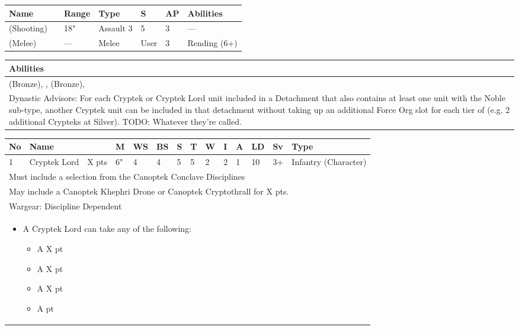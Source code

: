 \noindent
\begin{tabular}{||m{110pt} m{30pt} m{31pt} m{55pt} m{12pt} m{12pt} m{210pt}||}
	\hline
	Name & & Range & Type & S & AP & Abilities \\
	\hline
	\quickref{Staff of Light} (Shooting) & & 18" & Assault 3 & 5 & 3 & — \\
	\quickref{Staff of Light} (Melee) & & — & Melee & User & 3 & Rending (6+) \\
	\hline
\end{tabular}

\noindent
\begin{tabular}{||m{532pt}||}
	\hline
	Abilities \\
	\hline
	\quickref{Awakening Protocols}(Bronze), \quickref{Living Metal}, \quickref{Nodal Command} (Bronze), \quickref{Reanimation Protocols} \\
	Dynastic Advisors: For each Cryptek or Cryptek Lord unit included in a Detachment that also contains at least one unit with the Noble sub-type, another Cryptek unit can be included in that detachment without taking up an additional Force Org slot for each tier of \quickref{Command Protocols} (e.g. 2 additional Crypteks at Silver). TODO: Whatever they're called. \\
	\hline
\end{tabular}



\newpage
{}

\noindent
\begin{tabular}{||m{10pt} m{95pt} m{30pt} m{11pt} m{11pt} m{11pt} m{11pt} m{11pt} m{11pt} m{11pt} m{11pt} m{11pt} m{11pt} m{125pt}||}
	\hline
	No & Name & & M & WS & BS & S & T & W & I & A & LD & Sv & Type \\
	\hline
	1 & Cryptek Lord & X pts & 6" & 4 & 4 & 5 & 5 & 2 & 2 & 1 & 10 & 3+ & Infantry (Character)\\
	\hline
	\hline
	\multicolumn{14}{||Z{532 pt}||}{Must include a selection from the Canoptek Conclave Disciplines}\\
	\multicolumn{14}{||Z{532 pt}||}{May include a Canoptek Khephri Drone or Canoptek Cryptothrall for X pts.}\\	
	\hline
	\hline
	\multicolumn{14}{||Z{532 pt}||}{Wargear: Discipline Dependent} \\		
	\multicolumn{14}{||Z{532 pt}||}{\begin{itemize}
			\item A Cryptek Lord can take any of the following:
			\begin{itemize}
				\item A \quickref{Phase Shifter} \hrulefill X pt
				\item A \quickref{Phylactery} \hrulefill X pt
				\item A \quickref{Sempiternal Weave} \hrulefill X pt
				\item A \quickref{Tesseract Labyrinth} \hrulefill 100 pt
			\end{itemize}
	\end{itemize}} \\	
	\hline
\end{tabular}

